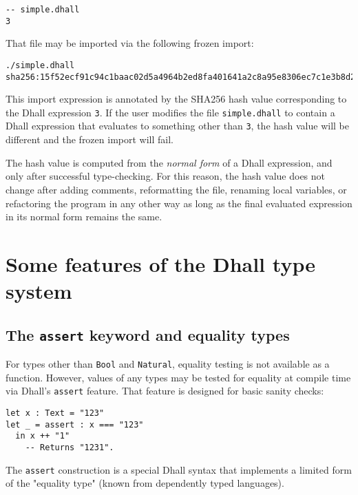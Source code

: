 \begin{lstlisting}[language=Dhall]
-- simple.dhall
3
\end{lstlisting}


That file may be imported via the following frozen import:


\begin{lstlisting}[language=Dhall]
./simple.dhall sha256:15f52ecf91c94c1baac02d5a4964b2ed8fa401641a2c8a95e8306ec7c1e3b8d2
\end{lstlisting}


This import expression is annotated by the SHA256 hash value corresponding to the Dhall expression \lstinline!3!.
If the user modifies the file \lstinline!simple.dhall! to contain a Dhall expression that evaluates to something other than \lstinline!3!, the hash value will be different and the frozen import will fail.


The hash value is computed from the \emph{normal form} of a Dhall expression, and only after successful type-checking.
For this reason, the hash value does not change after adding comments, reformatting the file, renaming local variables, or refactoring the program in any other way as long as the final evaluated expression in its normal form remains the same.


\section{Some features of the Dhall type system}


\subsection{The \lstinline!assert! keyword and equality types}


For types other than \lstinline!Bool! and \lstinline!Natural!, equality testing is not available as a function.
However, values of any types may be tested for equality at compile time via Dhall's \lstinline!assert! feature.
That feature is designed for basic sanity checks:


\begin{lstlisting}[language=Dhall]
let x : Text = "123"
let _ = assert : x === "123"
  in x ++ "1"
    -- Returns "1231".
\end{lstlisting}


The \lstinline!assert! construction is a special Dhall syntax that implements a limited form of the "equality type" (known from dependently typed languages).



